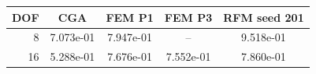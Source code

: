 \begin{tabular}{rcccc}
\toprule
DOF & CGA & FEM P1 & FEM P3 & RFM seed 201 \\
\midrule
8 & 7.073e-01 & 7.947e-01 & -- & 9.518e-01 \\
16 & 5.288e-01 & 7.676e-01 & 7.552e-01 & 7.860e-01 \\
\bottomrule
\end{tabular}
